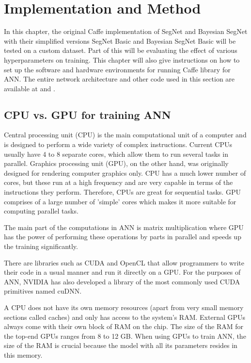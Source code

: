 \chapter{Implementation and Method}

In this chapter, the original Caffe implementation of SegNet and Bayesian SegNet with their simplified versions SegNet Basic and Bayesian SegNet Basic will be tested on a custom dataset. Part of this will be evaluating the effect of various hyperparameters on training. This chapter will also give instructions on how to set up the software and hardware environments for running Caffe library for ANN. The entire network architecture and other code used in this section are available at \cite{filip_github} and \cite{filip_github_caffe}.

\section{CPU vs. GPU for training ANN}

Central processing unit (CPU) is the main computational unit of a computer and is designed to perform a wide variety of complex instructions. Current CPUs usually have 4 to 8 separate cores, which allow them to run several tasks in parallel. Graphics processing unit (GPU), on the other hand, was originally designed for rendering computer graphics only. CPU has a much lower number of cores, but these run at a high frequency and are very capable in terms of the instructions they perform. Therefore, CPUs are great for sequential tasks. GPU comprises of a large number of 'simple' cores which makes it more suitable for computing parallel tasks. \cite{stanford-L8}

The main part of the computations in ANN is matrix multiplication where GPU has the power of performing these operations by parts in parallel and speeds up the training significantly. \cite{stanford-L8}

There are libraries such as CUDA and OpenCL that allow programmers to write their code in a usual manner and run it directly on a GPU. For the purposes of ANN, NVIDIA has also developed a library of the most commonly used CUDA primitives named cuDNN. \cite{stanford-L8}
 
A CPU does not have its own memory resources (apart from very small memory sections called caches) and only has access to the system's RAM. External GPUs always come with their own block of RAM on the chip. The size of the RAM for the top-end GPUs ranges from 8 to 12 GB. When using GPUs to train ANN, the size of the RAM is crucial because the model with all its parameters resides in this memory. 

